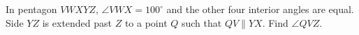 In pentagon $VWXYZ$, $\angle VWX=100^\circ$ and the other four interior angles are equal. Side $YZ$ is extended past $Z$ to a point $Q$ such that $QV\parallel YX$. Find $\angle QVZ$.
